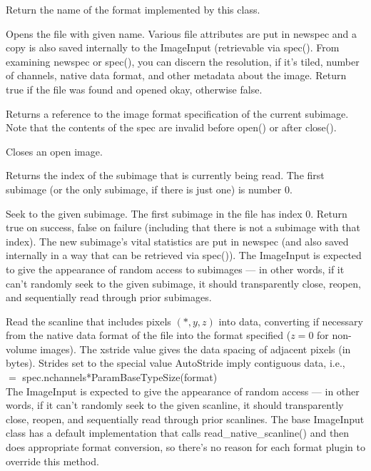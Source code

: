 Return the name of the format implemented by this class.
\apiend

Opens the file with given name.  Various file attributes are put in
{\kw newspec} and a copy is also saved internally to the
{\kw ImageInput} (retrievable via {\kw spec()}.  From examining
{\kw newspec} or {\kw spec()}, you can discern the resolution, if it's
tiled, number of channels, native data format, and other metadata about
the image.  Return {\kw true} if the file was found and opened okay,
otherwise {\kw false}.
\apiend

Returns a reference to the image format specification of the
current subimage.  Note that the contents of the spec are
invalid before {\kw open()} or after {\kw close()}.
\apiend

Closes an open image.
\apiend


Returns the index of the subimage that is currently being read.
The first subimage (or the only subimage, if there is just one) is
number 0.
\apiend


Seek to the given subimage.  The first subimage in the file has index 0.
Return {\kw true} on success, {\kw false} on failure (including that
there is not a subimage with that index).  The new subimage's vital
statistics are put in {\kw newspec} (and also saved internally in a way
that can be retrieved via {\kw spec()}).  The {\kw ImageInput} is
expected to give the appearance of random access to subimages --- in
other words, if it can't randomly seek to the given subimage, it should
transparently close, reopen, and sequentially read through prior
subimages.
\apiend


Read the scanline that includes pixels $(*,y,z)$ into {\kw data},
converting if necessary from the native data format of the file into the
{\kw format} specified ($z=0$ for non-volume images).  The {\kw xstride}
value gives the data spacing of adjacent pixels (in bytes).  Strides set
to the special value {\kw AutoStride} imply contiguous data, i.e., \\
   $=$ {\kw spec.nchannels*ParamBaseTypeSize(format)} \\
The {\kw ImageInput} is expected to give the appearance of random access
--- in other words, if it can't randomly seek to the given scanline, it
should transparently close, reopen, and sequentially read through prior
scanlines.  The base {\kw ImageInput} class has a default implementation
that calls {\kw read_native_scanline()} and then does appropriate format
conversion, so there's no reason for each format plugin to override this
method.
\apiend

